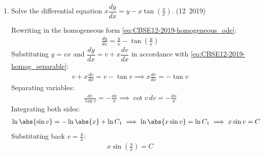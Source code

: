 \begin{enumerate}[label=\thesubsection.\arabic*, ref=\thesubsection.\theenumi]
\solution
Using partial fraction decomposition from \eqref{eq:CBSE12-2019-partial_fractions}:
\begin{align}
	\frac{x^2 + x + 1}{\brak{x + 2}\brak{x^2 + 1}} = \frac{A}{x + 2} + \frac{Bx + C}{x^2 + 1}
\end{align}
Multiplying by $\brak{x + 2}\brak{x^2 + 1}$:
\begin{align}
	x^2 + x + 1 &= A\brak{x^2 + 1} + \brak{Bx + C}\brak{x + 2} \\
	&= \brak{A + B}x^2 + \brak{2B + C}x + \brak{A + 2C}
\end{align}
Comparing coefficients of like powers of $x$:
\begin{align}
	A + B &= 1 \\
	2B + C &= 1 \\
	A + 2C &= 1
\end{align}
Solving this linear system yields $A = \frac{3}{5}$, $B = \frac{2}{5}$, and $C = \frac{1}{5}$. Thus:
\begin{align}
	\frac{x^2 + x + 1}{\brak{x + 2}\brak{x^2 + 1}} = \frac{3}{5}\brak{\frac{1}{x + 2}} + \frac{1}{5}\brak{\frac{2x}{x^2 + 1}} + \frac{1}{5}\brak{\frac{1}{x^2 + 1}}
\end{align}
Integrating term-by-term using \eqref{eq:CBSE12-2019-int_linear_denom}--\eqref{eq:CBSE12-2019-int_arctan}:
\begin{align}
	I &= \frac{3}{5}\int \frac{1}{x + 2}\,dx + \frac{1}{5}\int \frac{2x}{x^2 + 1}\,dx + \frac{1}{5}\int \frac{1}{x^2 + 1}\,dx \\
	&= \frac{3}{5}\ln\abs{x + 2} + \frac{1}{5}\ln\brak{x^2 + 1} + \frac{1}{5}\tan^{-1}x + C
\end{align}


\item Solve the differential equation $x\dfrac{dy}{dx} = y - x\tan\left(\frac{y}{x}\right)$.
\hfill (12~2019)

\solution
Rewriting in the homogeneous form \eqref{eq:CBSE12-2019-homogeneous_ode}:
\begin{align}
	\frac{dy}{dx} = \frac{y}{x} - \tan\left(\frac{y}{x}\right)
\end{align}
Substituting $y = vx$ and $\dfrac{dy}{dx} = v + x\dfrac{dv}{dx}$ in accordance with \eqref{eq:CBSE12-2019-homog_separable}:
\begin{align}
	v + x\frac{dv}{dx} = v - \tan v \implies x\frac{dv}{dx} = -\tan v
\end{align}
Separating variables:
\begin{align}
	\frac{dv}{\tan v} = -\frac{dx}{x} \implies \cot v\,dv = -\frac{dx}{x}
\end{align}
Integrating both sides:
\begin{align}
	\ln\abs{\sin v} = -\ln\abs{x} + \ln C_1 \implies \ln\abs{x\sin v} = \ln C_1 \implies x\sin v = C
\end{align}
Substituting back $v = \frac{y}{x}$:
\begin{align}
	x\sin\left(\frac{y}{x}\right) = C
\end{align}




\end{enumerate}
